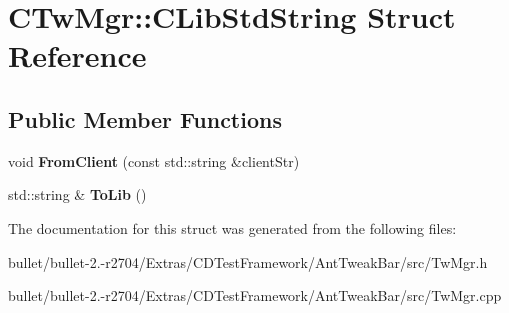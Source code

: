 \hypertarget{struct_c_tw_mgr_1_1_c_lib_std_string}{\section{C\+Tw\+Mgr\+:\+:C\+Lib\+Std\+String Struct Reference}
\label{struct_c_tw_mgr_1_1_c_lib_std_string}
}
\subsection*{Public Member Functions}
\begin{DoxyCompactItemize}
\item 
\hypertarget{struct_c_tw_mgr_1_1_c_lib_std_string_af9582f9433370ad9669efbe6fdf172dd}{void {\bfseries From\+Client} (const std\+::string \&client\+Str)}\label{struct_c_tw_mgr_1_1_c_lib_std_string_af9582f9433370ad9669efbe6fdf172dd}

\item 
\hypertarget{struct_c_tw_mgr_1_1_c_lib_std_string_a28ec2866908d3a7fb864724a76168825}{std\+::string \& {\bfseries To\+Lib} ()}\label{struct_c_tw_mgr_1_1_c_lib_std_string_a28ec2866908d3a7fb864724a76168825}

\end{DoxyCompactItemize}


The documentation for this struct was generated from the following files\+:\begin{DoxyCompactItemize}
\item 
bullet/bullet-\/2.-\/r2704/\+Extras/\+C\+D\+Test\+Framework/\+Ant\+Tweak\+Bar/src/Tw\+Mgr.\+h\item 
bullet/bullet-\/2.-\/r2704/\+Extras/\+C\+D\+Test\+Framework/\+Ant\+Tweak\+Bar/src/Tw\+Mgr.\+cpp\end{DoxyCompactItemize}
